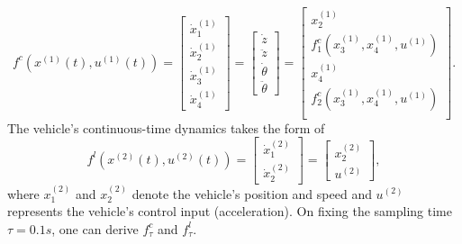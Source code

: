 \[f^{c}(x^{(1)}(t),u^{(1)}(t))=\begin{bmatrix}
	\dot{x}_1^{(1)}\\
	\dot{x}_2^{(1)}\\
	\dot{x}_3^{(1)}\\
	\dot{x}_4^{(1)}
\end{bmatrix}=\begin{bmatrix}
\dot{z}\\
\ddot{z}\\
\dot{\theta}\\
\ddot{\theta}
\end{bmatrix}=
\begin{bmatrix}
	x_2^{(1)}\\
	f^c_1(x_3^{(1)},x_4^{(1)},u^{(1)})\\
	x_4^{(1)}\\
	f^c_2(x_3^{(1)},x_4^{(1)},u^{(1)})\\
\end{bmatrix}.\]
The vehicle's continuous-time dynamics takes the form of
\[f^{l}(x^{(2)}(t),u^{(2)}(t))=\begin{bmatrix}
\dot{x}_1^{(2)}\\ \dot{x}^{(2)}_2 \end{bmatrix}=\begin{bmatrix} x^{(2)}_2\\ u^{(2)} \end{bmatrix},
\]
where $x_1^{(2)}$ and $x_2^{(2)}$ denote the vehicle's position and speed and $u^{(2)}$ represents the vehicle's control input (acceleration). 
On fixing the sampling time $\tau=0.1s$, one can derive $f^c_\tau$ and $f^l_\tau$. %


